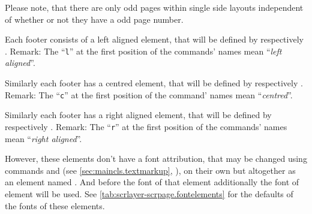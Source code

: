 Please note, that there are only odd pages within single
side layouts independent of whether or not they have a odd page number.

Each footer consists of a left aligned element, that will be defined by
 respectively . Remark: The ``\texttt{l}'' at the
first position of the commands' names mean ``\emph{left aligned}''.

Similarly each footer has a centred element, that will be defined by
 respectively . Remark: The ``\texttt{c}'' at the
first position of the command' names mean ``\emph{centred}''.

Similarly each footer has a right aligned element, that will be defined by
 respectively . Remark: The ``\texttt{r}'' at the
first position of the commands' names mean ``\emph{right aligned}''.

%
%
However, these elements don't have a font attribution, that may be changed
using commands  and  (see
\autoref{sec:maincls.textmarkup}, ),
on their own but altogether as an element named . And
before the font of that element additionally the font of element
 will be used. See
\autoref{tab:scrlayer-scrpage.fontelements} for the defaults of the fonts of
these elements.%
%
%

